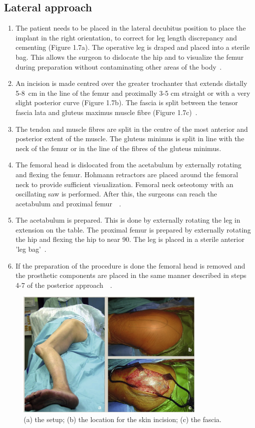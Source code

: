 \documentclass[whitelogo]{tudelft-report}
\begin{document}
{\subsection{Lateral approach}
\begin{enumerate}
	\item The patient needs to be placed in the lateral decubitus position to place the implant in the right orientation, to correct for leg length discrepancy and cementing (Figure 1.7a). The operative leg is draped and placed into a sterile bag. This allows the surgeon to dislocate the hip and to visualize the femur during preparation without contaminating other areas of the body~\cite{palan2018surgical}. 
	\item An incision is made centred over the greater trochanter that extends distally 5-8~cm in the line of the femur and proximally 3-5 cm straight or with a very slight posterior curve (Figure 1.7b). The fascia is split between the tensor fascia lata and gluteus maximus muscle fibre (Figure 1.7c)~\cite{petis2015surgical}.
	\item The tendon and muscle fibres are split in the centre of the most anterior and posterior extent of the muscle. The gluteus minimus is split in line with the neck of the femur or in the line of the fibres of the gluteus minimus. 
	\item The femoral head is dislocated from the acetabulum by externally rotating and flexing the femur. Hohmann retractors are placed around the femoral neck to provide sufficient visualization. Femoral neck osteotomy with an oscillating saw is performed. After this, the surgeons can reach the acetabulum and proximal femur~\cite{petis2015surgical}~\cite{palan2018surgical}.
	\item The acetabulum is prepared. This is done by externally rotating the leg in extension on the table. The proximal femur is prepared by externally rotating the hip and flexing the hip to near 90\degree. The leg is placed in a sterile anterior 'leg bag'~\cite{palan2018surgical}. 
	\item If the preparation of the procedure is done the femoral head is removed and the prosthetic components are placed in the same manner described in steps 4-7 of the posterior approach~\cite{palan2018surgical}~\cite{petis2015surgical}. 
\end{enumerate}

\begin{figure}[ht]
	\centering\includegraphics[width=260pt]{lateral_approach_beter.jpg}
	\caption{(a) the setup; (b) the location for the skin incision; (c) the fascia.~\cite{palan2018surgical}}
\end{figure}

}
\end{document}
